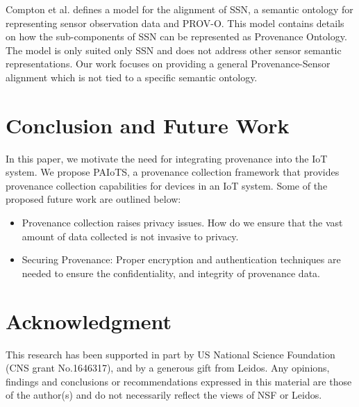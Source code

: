 \documentclass[conference]{IEEEtran}
\begin{document}
\par Compton et al.\cite{compton2014sensor} defines a model for the alignment of SSN, a semantic ontology for representing sensor observation data and PROV-O. This model contains details on how the sub-components of SSN can be represented as Provenance Ontology. The model is only suited only SSN and does not address other sensor semantic representations. Our work focuses on providing a general Provenance-Sensor alignment which is not tied to a specific semantic ontology.

\section{Conclusion and Future Work}
In this paper, we motivate the need for integrating provenance into the IoT system. 
We propose PAIoTS, a provenance collection framework that provides provenance collection capabilities for devices in an IoT system. Some of the proposed future work are outlined below:
\begin{itemize}

\item Provenance collection raises privacy issues. How do we ensure that the vast amount of data collected is not invasive to privacy.

\item Securing Provenance: Proper encryption and authentication techniques \cite{Hasan:2009:CFP:1525908.1525909} are needed to ensure the confidentiality, and integrity of provenance data.

\end{itemize}






\section*{Acknowledgment}

This research has been supported in part by US National Science Foundation
 (CNS grant No.1646317), and by a generous gift from Leidos. Any opinions, findings and conclusions or recommendations expressed in this material are those of the author(s) and do not necessarily reflect the views of NSF or Leidos.





\end{document}
